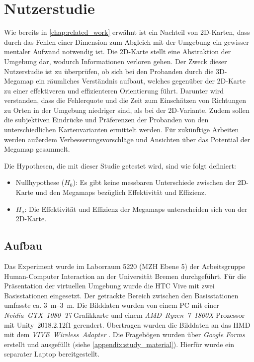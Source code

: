 \chapter{Nutzerstudie}
\label{chap:evaluation}
Wie bereits in \autoref{chap:related_work} erwähnt ist ein Nachteil von 2D-Karten, dass durch das Fehlen einer Dimension zum Abgleich mit der Umgebung ein gewisser mentaler Aufwand notwendig ist.
Die 2D-Karte stellt eine Abstraktion der Umgebung dar, wodurch Informationen verloren gehen.
Der Zweck dieser Nutzerstudie ist zu überprüfen, ob sich bei den Probanden durch die 3D-Megamap ein räumliches Verständnis aufbaut, welches gegenüber der 2D-Karte zu einer effektiveren und effizienteren Orientierung führt.
Darunter wird verstanden, dass die Fehlerquote und die Zeit zum Einschätzen von Richtungen zu Orten in der Umgebung niedriger sind, als bei der 2D-Variante.
Zudem sollen die subjektiven Eindrücke und Präferenzen der Probanden von den unterschiedlichen Kartenvarianten ermittelt werden.
Für zukünftige Arbeiten werden außerdem Verbesserungsvorschläge und Ansichten über das Potential der Megamap gesammelt.

Die Hypothesen, die mit dieser Studie getestet wird, sind wie folgt definiert:
\begin{itemize}
    \item Nullhypothese ($H_0$): Es gibt keine messbaren Unterschiede zwischen der 2D-Karte und den Megamaps bezüglich Effektivität und Effizienz.
    \item $H_a$: Die Effektivität und Effizienz der Megamaps unterscheiden sich von der 2D-Karte.
\end{itemize}

\section{Aufbau}
Das Experiment wurde im Laborraum 5220 (MZH Ebene 5) der Arbeitsgruppe Human-Computer Interaction an der Universität Bremen durchgeführt.
Für die Präsentation der virtuellen Umgebung wurde die HTC Vive mit zwei Basisstationen eingesetzt.
Der getrackte Bereich zwischen den Basisstationen umfasste ca. \SIrange{3}{3}{\metre}.
Die Bilddaten wurden von einem PC mit einer \emph{Nvidia~GTX~1080~Ti} Grafikkarte und einem \emph{AMD~Ryzen~7~1800X} Prozessor mit Unity~2018.2.12f1 gerendert.
Übertragen wurden die Bilddaten an das HMD mit dem \emph{VIVE~Wireless~Adapter} \parencite{HTCCorporation2018b}.
Die Fragebögen wurden über \emph{Google Forms} erstellt und ausgefüllt (siehe \autoref{appendix:study_material}).
Hierfür wurde ein separater Laptop bereitgestellt.

